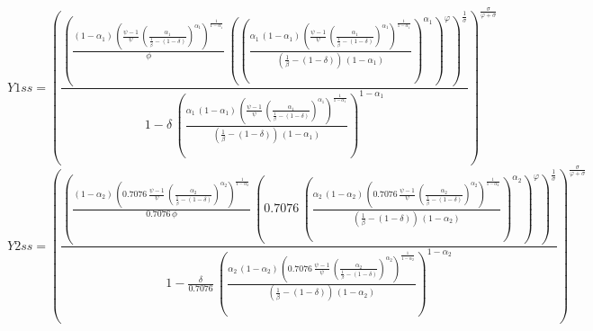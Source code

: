 \begin{dmath*}
Y1ss = \left(\frac{\left(\frac{\left(1-{{\alpha_{1}}}\right)\, \left(\frac{{{\psi}}-1}{{{\psi}}}\, \left(\frac{{{\alpha_{1}}}}{\frac{1}{{{\beta}}}-\left(1-{{\delta}}\right)}\right)^{{{\alpha_{1}}}}\right)^{\frac{1}{1-{{\alpha_{1}}}}}}{{{\phi}}}\, \left(\left(\frac{{{\alpha_{1}}}\, \left(1-{{\alpha_{1}}}\right)\, \left(\frac{{{\psi}}-1}{{{\psi}}}\, \left(\frac{{{\alpha_{1}}}}{\frac{1}{{{\beta}}}-\left(1-{{\delta}}\right)}\right)^{{{\alpha_{1}}}}\right)^{\frac{1}{1-{{\alpha_{1}}}}}}{\left(\frac{1}{{{\beta}}}-\left(1-{{\delta}}\right)\right)\, \left(1-{{\alpha_{1}}}\right)}\right)^{{{\alpha_{1}}}}\right)^{{{\varphi}}}\right)^{\frac{1}{{{\sigma}}}}}{1-{{\delta}}\, \left(\frac{{{\alpha_{1}}}\, \left(1-{{\alpha_{1}}}\right)\, \left(\frac{{{\psi}}-1}{{{\psi}}}\, \left(\frac{{{\alpha_{1}}}}{\frac{1}{{{\beta}}}-\left(1-{{\delta}}\right)}\right)^{{{\alpha_{1}}}}\right)^{\frac{1}{1-{{\alpha_{1}}}}}}{\left(\frac{1}{{{\beta}}}-\left(1-{{\delta}}\right)\right)\, \left(1-{{\alpha_{1}}}\right)}\right)^{1-{{\alpha_{1}}}}}\right)^{\frac{{{\sigma}}}{{{\varphi}}+{{\sigma}}}}
\end{dmath*}
\begin{dmath*}
Y2ss = \left(\frac{\left(\frac{\left(1-{{\alpha_{2}}}\right)\, \left(0.7076\, \frac{{{\psi}}-1}{{{\psi}}}\, \left(\frac{{{\alpha_{2}}}}{\frac{1}{{{\beta}}}-\left(1-{{\delta}}\right)}\right)^{{{\alpha_{2}}}}\right)^{\frac{1}{1-{{\alpha_{2}}}}}}{0.7076\, {{\phi}}}\, \left(0.7076\, \left(\frac{{{\alpha_{2}}}\, \left(1-{{\alpha_{2}}}\right)\, \left(0.7076\, \frac{{{\psi}}-1}{{{\psi}}}\, \left(\frac{{{\alpha_{2}}}}{\frac{1}{{{\beta}}}-\left(1-{{\delta}}\right)}\right)^{{{\alpha_{2}}}}\right)^{\frac{1}{1-{{\alpha_{2}}}}}}{\left(\frac{1}{{{\beta}}}-\left(1-{{\delta}}\right)\right)\, \left(1-{{\alpha_{2}}}\right)}\right)^{{{\alpha_{2}}}}\right)^{{{\varphi}}}\right)^{\frac{1}{{{\sigma}}}}}{1-\frac{{{\delta}}}{0.7076}\, \left(\frac{{{\alpha_{2}}}\, \left(1-{{\alpha_{2}}}\right)\, \left(0.7076\, \frac{{{\psi}}-1}{{{\psi}}}\, \left(\frac{{{\alpha_{2}}}}{\frac{1}{{{\beta}}}-\left(1-{{\delta}}\right)}\right)^{{{\alpha_{2}}}}\right)^{\frac{1}{1-{{\alpha_{2}}}}}}{\left(\frac{1}{{{\beta}}}-\left(1-{{\delta}}\right)\right)\, \left(1-{{\alpha_{2}}}\right)}\right)^{1-{{\alpha_{2}}}}}\right)^{\frac{{{\sigma}}}{{{\varphi}}+{{\sigma}}}}
\end{dmath*}

